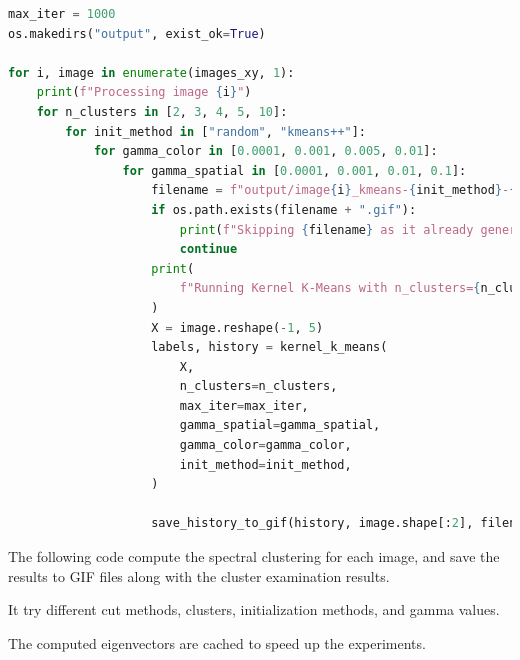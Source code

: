 \documentclass{homework}
\begin{document}
\begin{lstlisting}[language=Python]
max_iter = 1000
os.makedirs("output", exist_ok=True)

for i, image in enumerate(images_xy, 1):
    print(f"Processing image {i}")
    for n_clusters in [2, 3, 4, 5, 10]:
        for init_method in ["random", "kmeans++"]:
            for gamma_color in [0.0001, 0.001, 0.005, 0.01]:
                for gamma_spatial in [0.0001, 0.001, 0.01, 0.1]:
                    filename = f"output/image{i}_kmeans-{init_method}-{n_clusters}-{gamma_color}-{gamma_spatial}"
                    if os.path.exists(filename + ".gif"):
                        print(f"Skipping {filename} as it already generated")
                        continue
                    print(
                        f"Running Kernel K-Means with n_clusters={n_clusters}, gamma_color={gamma_color}, gamma_spatial={gamma_spatial}, init_method={init_method}"
                    )
                    X = image.reshape(-1, 5)
                    labels, history = kernel_k_means(
                        X,
                        n_clusters=n_clusters,
                        max_iter=max_iter,
                        gamma_spatial=gamma_spatial,
                        gamma_color=gamma_color,
                        init_method=init_method,
                    )

                    save_history_to_gif(history, image.shape[:2], filename)
\end{lstlisting}

The following code compute the spectral clustering for each image, and save the results to GIF files along with the cluster examination results.

It try different cut methods, clusters, initialization methods, and gamma values.

The computed eigenvectors are cached to speed up the experiments.
\end{document}

